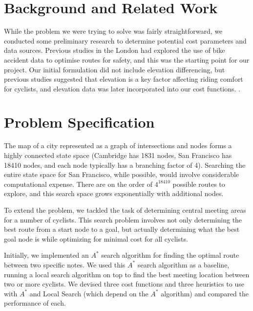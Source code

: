 \documentclass[11pt]{article}
\begin{document}


\section{Background and Related Work}

While the problem we were trying to solve was fairly straightforward, we conducted some preliminary research to determine potential cost parameters and data sources. Previous studies in the London had explored the use of bike accident data to optimise routes for safety, and this was the starting point for our project. Our initial formulation did not include elevation differencing, but previous studies suggested that elevation is a key factor affecting riding comfort for cyclists, and elevation data was later incorporated into our cost functions.   \cite{pmbr}.

\section{Problem Specification}
The map of a city represented as a graph of intersections and nodes forms a highly connected state space (Cambridge has 1831 nodes, San Francisco has 18410 nodes, and each node typically has a branching factor of 4). Searching the entire state space for San Francisco, while possible, would involve considerable computational expense. There are on the order of $4^{18410}$ possible routes to explore, and this search space grows exponentially with additional nodes.
\par To extend the problem, we tackled the task of determining central meeting areas for a number of cyclists. This search problem involves not only determining the best route from a start node to a goal, but actually determining what the best goal node is while optimizing for minimal cost for all cyclists.
\par Initially, we implemented an $A^{*}$ search algorithm for finding the optimal route between two specific notes. We used this $A^{*}$ search algorithm as a baseline, running a local search algorithm on top to find the best meeting location between two or more cyclists. We devised three cost functions and three heuristics to use with $A^{*}$ and Local Search (which depend on the $A^{*}$ algorithm) and compared the performance of each.
\end{document}
